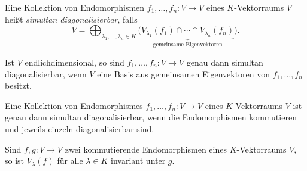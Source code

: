 \begin{definition}
  Eine Kollektion von Endomorphismen $f_1, \dotsc, f_n \colon V \to V$ eines $K$-Vek\-tor\-raums $V$ heißt \emph{simultan diagonalisierbar}, falls
  \[
    V
    = \bigoplus_{\lambda_1, \dotsc, \lambda_n \in K}
      \bigg(
        \underbrace{ V_{\lambda_1}(f_1) \cap \dotsb \cap V_{\lambda_n}(f_n) }_{\text{gemeinsame Eigenvektoren}}
      \bigg).
  \]
\end{definition}


\begin{remark}
  Ist $V$ endlichdimensional, so sind $f_1, \dotsc, f_n \colon V \to V$ genau dann simultan diagonalisierbar, wenn $V$ eine Basis aus gemeinsamen Eigenvektoren von $f_1, \dotsc, f_n$ besitzt.
\end{remark}


\begin{theorem}\label{thrm: simultaneous diagonalizability}
  Eine Kollektion von Endomorphismes $f_1, \dotsc, f_n \colon V \to V$ eines $K$-Vek\-tor\-raums $V$ ist genau dann simultan diagonalisierbar, wenn die Endomorphismen kommutieren und jeweils einzeln diagonalisierbar sind.
\end{theorem}


\begin{lemma}
  Sind $f, g \colon V \to V$ zwei kommutierende Endomorphismen eines $K$-Vek\-tor\-raums $V$, so ist $V_\lambda(f)$ für alle $\lambda \in K$ invariant unter $g$.
\end{lemma}


